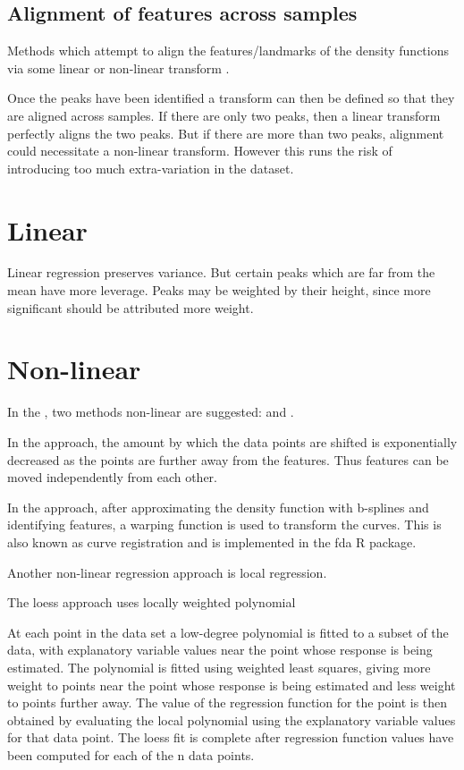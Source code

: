 \subsection{Alignment of features across samples}

Methods which attempt to align the features/landmarks of the density functions via some linear or non-linear transform \citep{Hahne:2009hl}.

Once the peaks have been identified a transform can then be defined so that they are aligned across samples.
If there are only two peaks, then a linear transform perfectly aligns the two peaks.
But if there are more than two peaks, alignment could necessitate a non-linear transform.
However this runs the risk of introducing too much extra-variation in the dataset.

\section{Linear}

Linear regression preserves variance.
But certain peaks which are far from the mean have more leverage.
Peaks may be weighted by their height, since more significant should be attributed more weight.


\section{Non-linear}

In the , two methods non-linear are suggested:  and .

In the  approach, the amount by which the data points are shifted is exponentially decreased as the points are further away from the features.
Thus features can be moved independently from each other.

In the  approach, after approximating the density function with b-splines and identifying features, a warping function is used to transform the curves.
This is also known as curve registration and is implemented in the fda R package.

Another non-linear regression approach is local regression.

The loess approach uses locally weighted polynomial

At each point in the data set a low-degree polynomial is fitted to a subset of the data, with explanatory variable values near the point whose response is being estimated.
The polynomial is fitted using weighted least squares, giving more weight to points near the point whose response is being estimated and less weight to points further away.
The value of the regression function for the point is then obtained by evaluating the local polynomial using the explanatory variable values for that data point.
The loess fit is complete after regression function values have been computed for each of the n data points.


